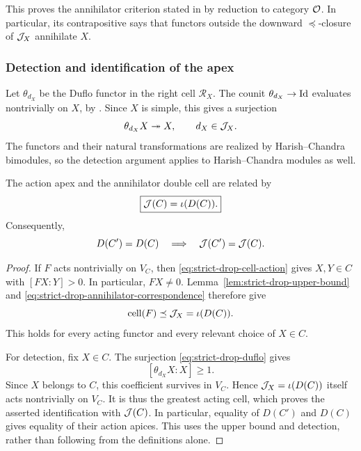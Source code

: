 This proves the annihilator criterion stated in
\cite[\S3.2]{MackaayMazorchukMiemietz2024} by reduction to category $\mathcal{O}$.
In particular, its contrapositive says that functors outside the downward
$\preceq$-closure of $\mathcal{J}_X$ annihilate $X$.

\subsubsection{Detection and identification of the apex}

Let $\theta_{d_X}$ be the Duflo functor in the right cell $\mathcal R_X$.
The counit $\theta_{d_X}\to\operatorname{Id}$ evaluates nontrivially on $X$, by
\cite[Rem.~12]{MackaayMazorchukMiemietz2024}. Since $X$ is simple, this
gives a surjection
\begin{equation}\label{eq:strict-drop-duflo}
  \theta_{d_X}X\twoheadrightarrow X,
  \qquad d_X\in\mathcal{J}_X.
\end{equation}
The functors and their natural transformations are realized by
Harish--Chandra bimodules, so the detection argument applies to
Harish--Chandra modules as well.

\begin{prop}\label{prop:strict-drop-apex}
The action apex and the annihilator double cell are related by
\[
  \boxed{\mathcal{J}(C)=\iota(D(C)).}
\]
Consequently,
\begin{equation}\label{eq:strict-drop-common-apex}
  D(C')=D(C)\quad\Longrightarrow\quad\mathcal{J}(C')=\mathcal{J}(C).
\end{equation}
\end{prop}

\begin{proof}
If $F$ acts nontrivially on $V_C$, then
\eqref{eq:strict-drop-cell-action} gives $X,Y\in C$ with $[FX:Y]>0$.
In particular, $FX\neq0$. Lemma~\ref{lem:strict-drop-upper-bound} and
\eqref{eq:strict-drop-annihilator-correspondence} therefore give
\[
  \operatorname{cell}(F)\preceq\mathcal{J}_X=\iota(D(C)).
\]
This holds for every acting functor and every relevant choice of $X\in C$.

For detection, fix $X\in C$. The surjection
\eqref{eq:strict-drop-duflo} gives
\[
  [\theta_{d_X}X:X]\geq1.
\]
Since $X$ belongs to $C$, this coefficient survives in $V_C$. Hence
$\mathcal{J}_X=\iota(D(C))$ itself acts nontrivially on $V_C$. It is thus the
greatest acting cell, which proves the asserted identification with
$\mathcal{J}(C)$. In particular, equality of $D(C')$ and $D(C)$ gives equality of
their action apices. This uses the upper bound and detection, rather than
following from the definitions alone.
\end{proof}


